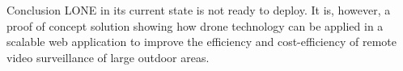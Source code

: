 \begin{frame}{Conclusion}
LONE in its current state is not ready to deploy. It is, however, a proof of concept solution showing how drone technology can be applied in a scalable web application to improve the efficiency and cost-efficiency of remote video surveillance of large outdoor areas.
\end{frame}